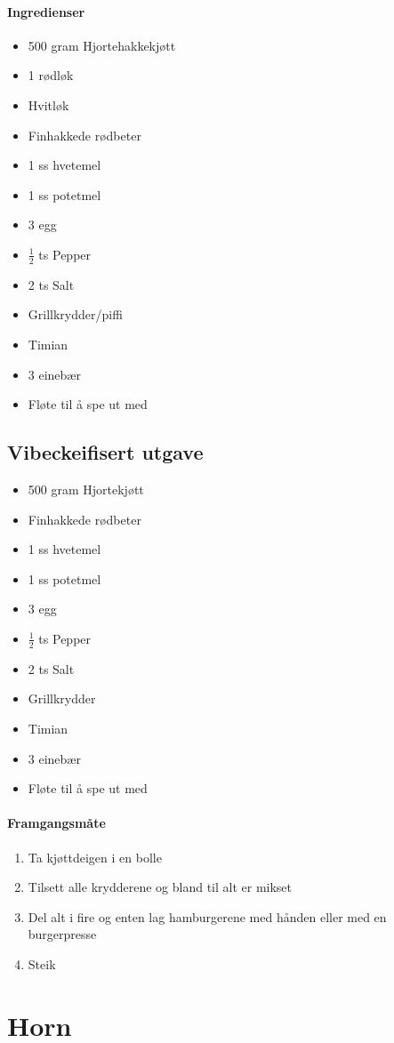 \documentclass[12pt,a4paper]{book}
\begin{document}
\paragraph{Ingredienser}
\begin{itemize}[noitemsep]
	\item 500 gram Hjortehakkekjøtt
	\item	1 rødløk
	\item	Hvitløk
	\item	Finhakkede rødbeter
	\item	1 ss hvetemel
	\item	1 ss potetmel
	\item	3 egg
	\item	$\frac{1}{2}$  ts Pepper
	\item	2 ts Salt
	\item	Grillkrydder/piffi
	\item	Timian
	\item	3 einebær
	\item	Fløte til å spe ut med
\end{itemize}

\subsection{Vibeckeifisert utgave}
\begin{itemize}[noitemsep]
	\item 500 gram Hjortekjøtt
	\item	Finhakkede rødbeter
	\item	1 ss hvetemel
	\item	1 ss potetmel
	\item	3 egg
	\item	 $\frac{1}{2}$  ts Pepper
	\item	2 ts Salt
	\item	Grillkrydder
	\item	Timian
	\item	3 einebær
	\item	Fløte til å spe ut med
\end{itemize}

\paragraph{Framgangsmåte}
\begin{enumerate}[noitemsep]
	\item Ta kjøttdeigen i en bolle
	\item Tilsett alle krydderene og bland til alt er mikset
	\item Del alt i fire og enten lag hamburgerene med hånden eller med en burgerpresse
	\item Steik
\end{enumerate}
\clearpage{}
\clearpage{}\section{﻿Horn}
\end{document}
